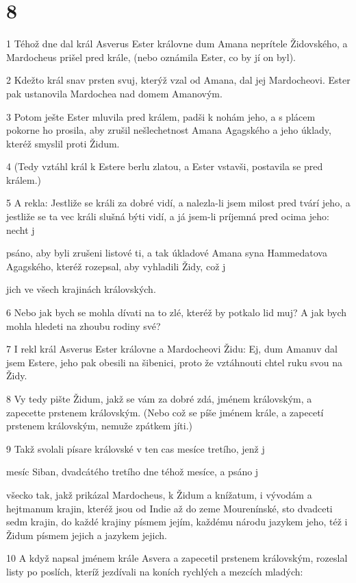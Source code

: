 \chapter{8}

\par 1 Téhož dne dal král Asverus Ester královne dum Amana neprítele Židovského, a Mardocheus prišel pred krále, (nebo oznámila Ester, co by jí on byl).
\par 2 Kdežto král snav prsten svuj, kterýž vzal od Amana, dal jej Mardocheovi. Ester pak ustanovila Mardochea nad domem Amanovým.
\par 3 Potom ješte Ester mluvila pred králem, padši k nohám jeho, a s plácem pokorne ho prosila, aby zrušil nešlechetnost Amana Agagského a jeho úklady, kteréž smyslil proti Židum.
\par 4 (Tedy vztáhl král k Estere berlu zlatou, a Ester vstavši, postavila se pred králem.)
\par 5 A rekla: Jestliže se králi za dobré vidí, a nalezla-li jsem milost pred tvárí jeho, a jestliže se ta vec králi slušná býti vidí, a já jsem-li príjemná pred ocima jeho: necht j\par psáno, aby byli zrušeni listové ti, a tak úkladové Amana syna Hammedatova Agagského, kteréž rozepsal, aby vyhladili Židy, což j\par jich ve všech krajinách královských.
\par 6 Nebo jak bych se mohla dívati na to zlé, kteréž by potkalo lid muj? A jak bych mohla hledeti na zhoubu rodiny své?
\par 7 I rekl král Asverus Ester královne a Mardocheovi Židu: Ej, dum Amanuv dal jsem Estere, jeho pak obesili na šibenici, proto že vztáhnouti chtel ruku svou na Židy.
\par 8 Vy tedy pište Židum, jakž se vám za dobré zdá, jménem královským, a zapecette prstenem královským. (Nebo což se píše jménem krále, a zapecetí prstenem královským, nemuže zpátkem jíti.)
\par 9 Takž svolali písare královské v ten cas mesíce tretího, jenž j\par mesíc Siban, dvadcátého tretího dne téhož mesíce, a psáno j\par všecko tak, jakž prikázal Mardocheus, k Židum a knížatum, i vývodám a hejtmanum krajin, kteréž jsou od Indie až do zeme Mourenínské, sto dvadceti sedm krajin, do každé krajiny písmem jejím, každému národu jazykem jeho, též i Židum písmem jejich a jazykem jejich.
\par 10 A když napsal jménem krále Asvera a zapecetil prstenem královským, rozeslal listy po poslích, kteríž jezdívali na koních rychlých a mezcích mladých:
